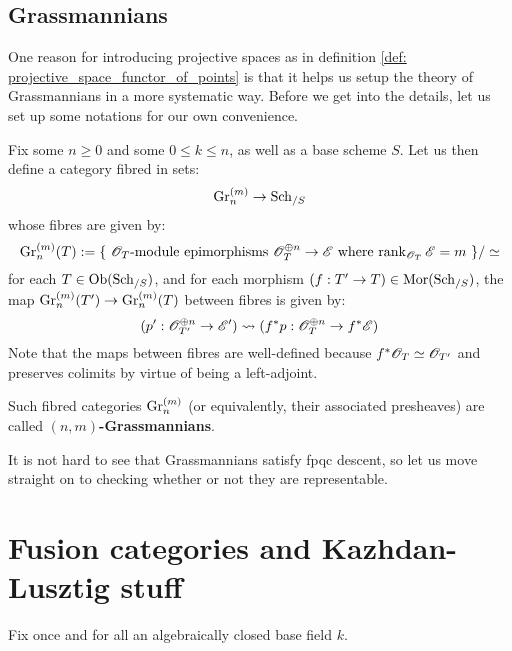         \subsection{Grassmannians}
            One reason for introducing projective spaces as in definition \ref{def: projective_space_functor_of_points} is that it helps us setup the theory of Grassmannians in a more systematic way. Before we get into the details, let us set up some notations for our own convenience.
            \begin{definition} \label{def: finite_grassmanians}
                Fix some $n \geq 0$ and some $0 \leq k \leq n$, as well as a base scheme $S$. Let us then define a category fibred in sets:
                    $$\mathrm{Gr}_n^{(m)} \to \mathrm{Sch}_{/S}$$
                whose fibres are given by:
                    $$\mathrm{Gr}_n^{(m)}(T) := \{ \text{ $\mathscr{O}_T$-module epimorphisms $\mathscr{O}_T^{\oplus n} \to \mathscr{E}$ where $\operatorname{rank}_{\mathscr{O}_T} \mathscr{E} = m$ } \}/\simeq$$
                for each $T \in \mathrm{Ob}(\mathrm{Sch}_{/S})$, and for each morphism $(f: T' \to T) \in \mathrm{Mor}(\mathrm{Sch}_{/S})$, the map $\mathrm{Gr}_n^{(m)}(T') \to \mathrm{Gr}_n^{(m)}(T)$ between fibres is given by:
                    $$( p': \mathscr{O}_{T'}^{\oplus n} \to \mathscr{E}' ) \leadsto ( f^*p: \mathscr{O}_T^{\oplus n} \to f^*\mathscr{E} )$$
                Note that the maps between fibres are well-defined because $f^*\mathscr{O}_T \simeq \mathscr{O}_{T'}$ and preserves colimits by virtue of being a left-adjoint.

                Such fibred categories $\mathrm{Gr}_n^{(m)}$ (or equivalently, their associated presheaves) are called \textbf{$(n, m)$-Grassmannians}.
            \end{definition}

            It is not hard to see that Grassmannians satisfy fpqc descent, so let us move straight on to checking whether or not they are representable.

    \section{Fusion categories and Kazhdan-Lusztig stuff}
        \begin{convention}
            Fix once and for all an algebraically closed base field $k$.
        \end{convention}
    
